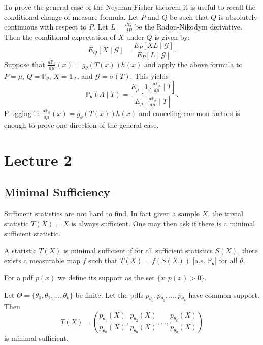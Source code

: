 \begin{remark}
	To prove the general case of the Neyman-Fisher theorem it is useful to recall the conditional change of measure formula. Let $P$ and $Q$ be such that $Q$ is absolutely continuous with respect to $P$. Let $L = \frac{dQ}{dP}$ be the Radon-Nikodym derivative. Then the conditional expectation of $X$ under $Q$ is given by:$$E_Q[X \mid \mathcal{G}] = \frac{E_P[X L \mid \mathcal{G}]}{E_P[L \mid \mathcal{G}]}.$$ Suppose that $\frac{d\mathbb P_\theta}{d\mu}(x) = g_\theta(T(x)) h(x)$ and apply the above formula to $P = \mu$, $Q = \mathbb P_\theta$, $X = \mathbf{1}_A$, and $\mathcal{G} = \sigma(T)$. This yields \[
	\mathbb P_\theta(A \mid T) = \frac{E_\mu[\mathbf{1}_A \frac{d\mathbb P_\theta}{d\mu} \mid T]}{E_\mu[\frac{d\mathbb P_\theta}{d\mu} \mid T]}.
	\] Plugging in $\frac{d\mathbb P_\theta}{d\mu}(x) = g_\theta(T(x)) h(x)$ and canceling common factors is enough to prove one direction of the general case.
\end{remark}

\newpage
\section{Lecture 2}

\subsection{Minimal Sufficiency}
\noindent Sufficient statistics are not hard to find. In fact given a sample $X$, the trivial statistic $T(X) = X$ is always sufficient. One may then ask if there is a minimal sufficient statistic. 

\begin{definition}
	A statistic $T(X)$ is minimal sufficient if for all sufficient statistics $S(X)$, there exists a measurable map $f$ such that $T(X) = f(S(X))$ [a.s. $\mathbb P_\theta$] for all $\theta$.
\end{definition}

\begin{definition}
	For a pdf $p(x)$ we define its support as the set $\{x : p(x) > 0\}$. 
\end{definition}

\begin{theorem}
	Let $\Theta = \{\theta_0, \theta_1, \dots, \theta_k\}$ be finite. Let the pdfs $p_{\theta_0},p_{\theta_1},\dots,p_{\theta_k}$ have common support. Then \[
	T(X) = \left( \frac{p_{\theta_1}(X)}{p_{\theta_0}(X)},\frac{p_{\theta_2}(X)}{p_{\theta_0}(X)},\dots,\frac{p_{\theta_k}(X)}{p_{\theta_0}(X)} \right) 
	\] is minimal sufficient.
\end{theorem}

